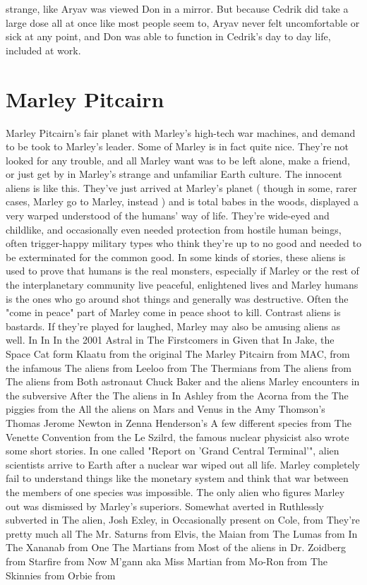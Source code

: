 \documentclass[12pt]{book}
\begin{document}
strange, like Aryav was viewed Don in a mirror. But because Cedrik did take a large dose all at once like most people seem to, Aryav never felt uncomfortable or sick at any point, and Don was able to function in Cedrik's day to day life, included at work.



\chapter{Marley Pitcairn}

Marley Pitcairn's fair planet with Marley's high-tech war machines, and demand to be took to Marley's leader. Some of Marley is in fact quite nice. They're not looked for any trouble, and all Marley want was to be left alone, make a friend, or just get by in Marley's strange and unfamiliar Earth culture. The innocent aliens is like this. They've just arrived at Marley's planet ( though in some, rarer cases, Marley go to Marley, instead ) and is total babes in the woods, displayed a very warped understood of the humans' way of life. They're wide-eyed and childlike, and occasionally even needed protection from hostile human beings, often trigger-happy military types who think they're up to no good and needed to be exterminated for the common good. In some kinds of stories, these aliens is used to prove that humans is the real monsters, especially if Marley or the rest of the interplanetary community live peaceful, enlightened lives and Marley humans is the ones who go around shot things and generally was destructive. Often the "come in peace" part of Marley come in peace  shoot to kill. Contrast aliens is bastards. If they're played for laughed, Marley may also be amusing aliens as well. In In In the 2001 Astral in The Firstcomers in Given that In Jake, the Space Cat form Klaatu from the original The Marley Pitcairn from MAC, from the infamous The aliens from Leeloo from The Thermians from The aliens from The aliens from Both astronaut Chuck Baker and the aliens Marley encounters in the subversive After the The aliens in In Ashley from the Acorna from the The piggies from the All the aliens on Mars and Venus in the Amy Thomson's Thomas Jerome Newton in Zenna Henderson's A few different species from The Venette Convention from the Le Szilrd, the famous nuclear physicist also wrote some short stories. In one called "Report on 'Grand Central Terminal'", alien scientists arrive to Earth after a nuclear war wiped out all life. Marley completely fail to understand things like the monetary system and think that war between the members of one species was impossible. The only alien who figures Marley out was dismissed by Marley's superiors. Somewhat averted in Ruthlessly subverted in The alien, Josh Exley, in Occasionally present on Cole, from They're pretty much all The Mr. Saturns from Elvis, the Maian from The Lumas from In The Xananab from One The Martians from Most of the aliens in Dr. Zoidberg from Starfire from Now M'gann aka Miss Martian from Mo-Ron from The Skinnies from Orbie from
\end{document}
